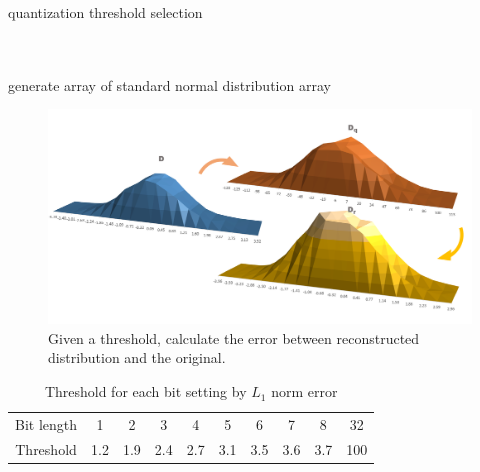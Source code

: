 \begin{algorithm}
    \SetAlgoLined
    \caption{quantization threshold selection}
    \label{alg:th_choice}
    \begin{algorithmic}[1]
         \\
        \ENSURE{$\tau$} \\
        generate  array of standard normal distribution array\\
        \ENDFOR
    \end{algorithmic}
\end{algorithm}
\begin{figure}
    \centering
    \includegraphics[width=1\linewidth]{inc/3_low_numeric_convolution_neural_network/figure/nor_dist.png}
    \caption{Given a threshold, calculate the error between reconstructed distribution and the original.}
    \label{fig:th_choice}
\end{figure}
\begin{table}[h]
    \caption{Threshold for each bit setting by $L_1$ norm error}
    \label{tab:threshold}
    \centering
    \footnotesize 
        \begin{tabular}{c|ccccccccc}
        \toprule
            Bit length &1 & 2 & 3 & 4 & 5 & 6 & 7 & 8 & 32 \\
            Threshold &1.2 & 1.9& 2.4& 2.7& 3.1& 3.5& 3.6& 3.7& 100 \\
 
        \bottomrule
        \end{tabular}
\end{table}

